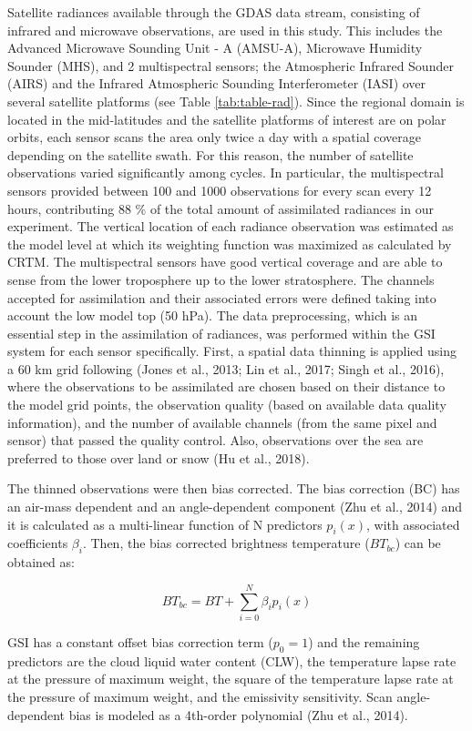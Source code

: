 \documentclass[authoryear,preprint,review,12pt]{elsarticle} %
\begin{document}
Satellite radiances available through the GDAS data stream, consisting of infrared and microwave observations, are used in this study. This includes the Advanced Microwave Sounding Unit - A (AMSU-A), Microwave Humidity Sounder (MHS), and 2 multispectral sensors; the Atmospheric Infrared Sounder (AIRS) and the Infrared Atmospheric Sounding Interferometer (IASI) over several satellite platforms (see Table \ref{tab:table-rad}). Since the regional domain is located in the mid-latitudes and the satellite platforms of interest are on polar orbits, each sensor scans the area only twice a day with a spatial coverage depending on the satellite swath. For this reason, the number of satellite observations varied significantly among cycles. In particular, the multispectral sensors provided between 100 and 1000 observations for every scan every 12 hours, contributing 88 \% of the total amount of assimilated radiances in our experiment. The vertical location of each radiance observation was estimated as the model level at which its weighting function was maximized as calculated by CRTM. The multispectral sensors have good vertical coverage and are able to sense from the lower troposphere up to the lower stratosphere.
The channels accepted for assimilation and their associated errors were defined taking into account the low model top (50 hPa). The data preprocessing, which is an essential step in the assimilation of radiances, was performed within the GSI system for each sensor specifically. First, a spatial data thinning is applied using a 60 km grid following (Jones et al., 2013; Lin et al., 2017; Singh et al., 2016), where the observations to be assimilated are chosen based on their distance to the model grid points, the observation quality (based on available data quality information), and the number of available channels (from the same pixel and sensor) that passed the quality control. Also, observations over the sea are preferred to those over land or snow (Hu et al., 2018).

The thinned observations were then bias corrected. The bias correction (BC) has an air-mass dependent and an angle-dependent component (Zhu et al., 2014) and it is calculated as a multi-linear function of N predictors \(p_i(x)\), with associated coefficients \(\beta_i\). Then, the bias corrected brightness temperature (\(BT_{bc}\)) can be obtained as:

\[\mathit{BT_{bc}} =\mathit{ BT} + \sum_{i = 0}^{N} \beta_i p_i (x)\]

GSI has a constant offset bias correction term (\(p_0 = 1\)) and the remaining predictors are the cloud liquid water content (CLW), the temperature lapse rate at the pressure of maximum weight, the square of the temperature lapse rate at the pressure of maximum weight, and the emissivity sensitivity. Scan angle-dependent bias is modeled as a 4th-order polynomial (Zhu et al., 2014).
\end{document}
